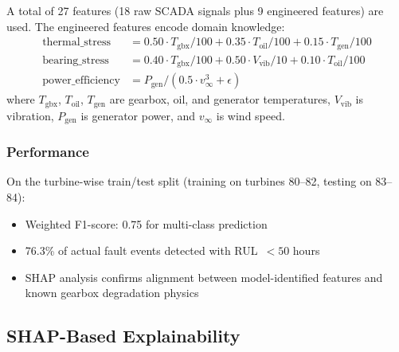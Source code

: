 \documentclass[12pt]{article}
\begin{document}
A total of 27 features (18 raw SCADA signals plus 9 engineered features) are used.
The engineered features encode domain knowledge:
\begin{align}
    \text{thermal\_stress} &= 0.50 \cdot T_{\text{gbx}}/100 + 0.35 \cdot T_{\text{oil}}/100 + 0.15 \cdot T_{\text{gen}}/100 \\
    \text{bearing\_stress} &= 0.40 \cdot T_{\text{gbx}}/100 + 0.50 \cdot V_{\text{vib}}/10 + 0.10 \cdot T_{\text{oil}}/100 \\
    \text{power\_efficiency} &= P_{\text{gen}} / (0.5 \cdot v_\infty^3 + \epsilon)
\end{align}
where $T_{\text{gbx}}$, $T_{\text{oil}}$, $T_{\text{gen}}$ are gearbox, oil, and generator temperatures, $V_{\text{vib}}$ is vibration, $P_{\text{gen}}$ is generator power, and $v_\infty$ is wind speed.

\subsubsection{Performance}

On the turbine-wise train/test split (training on turbines 80--82, testing on 83--84):
\begin{itemize}[leftmargin=*]
    \item Weighted F1-score: 0.75 for multi-class prediction
    \item 76.3\% of actual fault events detected with RUL~$< 50$ hours
    \item SHAP analysis confirms alignment between model-identified features and known gearbox degradation physics
\end{itemize}


\subsection{SHAP-Based Explainability}
\label{sec:shap}
\end{document}
